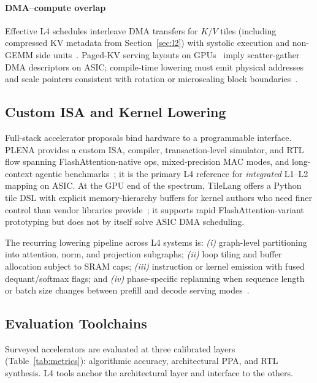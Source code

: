 \documentclass[conference]{IEEEtran}
\begin{document}
\paragraph{DMA--compute overlap}
Effective L4 schedules interleave DMA transfers for $K/V$ tiles (including compressed KV metadata from Section~\ref{sec:l2}) with systolic execution and non-GEMM side units~\cite{desa2025,wang2023cosa,plena2025}.
Paged-KV serving layouts on GPUs~\cite{sawint42026,bitdecoding2026} imply scatter-gather DMA descriptors on ASIC; compile-time lowering must emit physical addresses and scale pointers consistent with rotation or microscaling block boundaries~\cite{ashkboos2024quarot,batquant2026}.

\subsection{Custom ISA and Kernel Lowering}
\label{sec:l4-isa}

Full-stack accelerator proposals bind hardware to a programmable interface.
PLENA provides a custom ISA, compiler, transaction-level simulator, and RTL flow spanning FlashAttention-native ops, mixed-precision MAC modes, and long-context agentic benchmarks~\cite{plena2025}; it is the primary L4 reference for \emph{integrated} L1--L2 mapping on ASIC.
At the GPU end of the spectrum, TileLang offers a Python tile DSL with explicit memory-hierarchy buffers for kernel authors who need finer control than vendor libraries provide~\cite{tilelang2025}; it supports rapid FlashAttention-variant prototyping but does not by itself solve ASIC DMA scheduling.

The recurring lowering pipeline across L4 systems is:
\emph{(i)} graph-level partitioning into attention, norm, and projection subgraphs;
\emph{(ii)} loop tiling and buffer allocation subject to SRAM caps;
\emph{(iii)} instruction or kernel emission with fused dequant/softmax flags; and
\emph{(iv)} phase-specific replanning when sequence length or batch size changes between prefill and decode serving modes~\cite{plena2025,flatattention2026,sawint42026}.

\subsection{Evaluation Toolchains}
\label{sec:l4-tools}

Surveyed accelerators are evaluated at three calibrated layers (Table~\ref{tab:metrics}): algorithmic accuracy, architectural PPA, and RTL synthesis.
L4 tools anchor the architectural layer and interface to the others.
\end{document}
